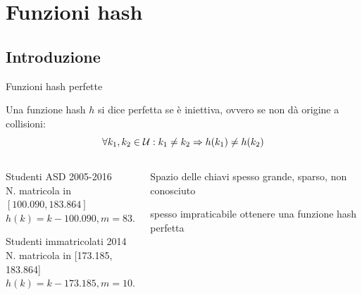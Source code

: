 \section{Funzioni hash}

\subsection{Introduzione}

\begin{frame}{Funzioni hash perfette}

\vspace{-9pt}
\begin{myboxtitle}[Definizione]
Una funzione hash $h$ si dice \alert{perfetta} se è \alert{iniettiva}, ovvero se non dà origine a collisioni:
\[
\forall k_1, k_2 \in {\cal U}: k_1 \neq k_2 \Rightarrow h(k_1) \neq h(k_2)
\]
\end{myboxtitle}

\vspace{-9pt}
\begin{columns}[T]
\begin{column}{0.55\textwidth}
\BIL
\item Studenti ASD 2005-2016\\ N. matricola in $[100.090, 183.864]$\\[6pt]
\(
  h(k) = k - 100.090, m = 83.774
\)
\item Studenti immatricolati 2014\\ N. matricola in [173.185, 183.864]\\[6pt]
\(
h(k) = k - 173.185, m = 10.679
\)
\EIL
\end{column}
\hfill
\begin{column}{0.40\textwidth}
\BIL
\item Spazio delle chiavi spesso grande, sparso, non conosciuto
\item \EE spesso impraticabile ottenere una funzione hash perfetta
\EIL
\end{column}
\end{columns}

\end{frame}



